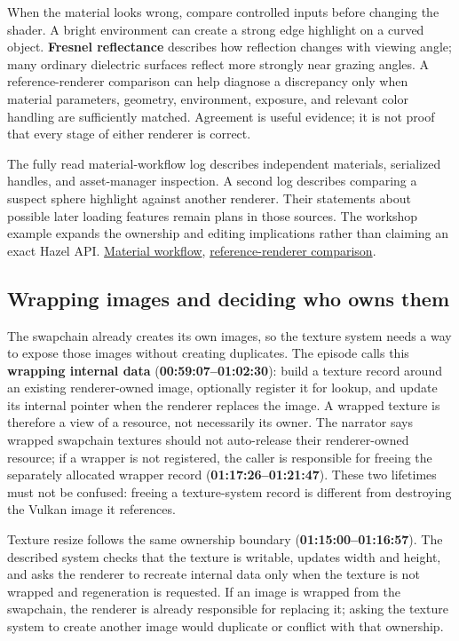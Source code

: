When the material looks wrong, compare controlled inputs before changing the shader. A bright environment can create a strong edge highlight on a curved object. \textbf{Fresnel reflectance} describes how reflection changes with viewing angle; many ordinary dielectric surfaces reflect more strongly near grazing angles. A reference-renderer comparison can help diagnose a discrepancy only when material parameters, geometry, environment, exposure, and relevant color handling are sufficiently matched. Agreement is useful evidence; it is not proof that every stage of either renderer is correct.

The fully read material-workflow log describes independent materials, serialized handles, and asset-manager inspection. A second log describes comparing a suspect sphere highlight against another renderer. Their statements about possible later loading features remain plans in those sources. The workshop example expands the ownership and editing implications rather than claiming an exact Hazel API. \href{https://www.youtube.com/watch?v=YIpqGPepQAs}{Material workflow}, \href{https://www.youtube.com/watch?v=ZtJ5AYpBgUM}{reference-renderer comparison}.

\subsection{Wrapping images and deciding who owns them}\label{06-engine-ii-ch027-wrapping-images-and-deciding-who-owns-them}

The swapchain already creates its own images, so the texture system needs a way to expose those images without creating duplicates. The episode calls this \textbf{wrapping internal data} (\textbf{00:59:07--01:02:30}): build a texture record around an existing renderer-owned image, optionally register it for lookup, and update its internal pointer when the renderer replaces the image. A wrapped texture is therefore a view of a resource, not necessarily its owner. The narrator says wrapped swapchain textures should not auto-release their renderer-owned resource; if a wrapper is not registered, the caller is responsible for freeing the separately allocated wrapper record (\textbf{01:17:26--01:21:47}). These two lifetimes must not be confused: freeing a texture-system record is different from destroying the Vulkan image it references.

Texture resize follows the same ownership boundary (\textbf{01:15:00--01:16:57}). The described system checks that the texture is writable, updates width and height, and asks the renderer to recreate internal data only when the texture is not wrapped and regeneration is requested. If an image is wrapped from the swapchain, the renderer is already responsible for replacing it; asking the texture system to create another image would duplicate or conflict with that ownership.

